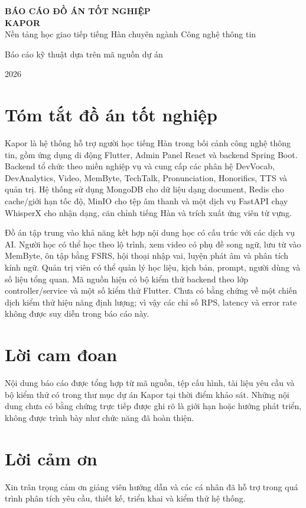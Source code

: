 \documentclass[12pt,a4paper]{report}
\begin{document}
\begin{titlepage}
\centering
\vspace*{1.2cm}
{\Large \textbf{BÁO CÁO ĐỒ ÁN TỐT NGHIỆP}}\\[1.2cm]
{\Huge \textbf{KAPOR}}\\[0.4cm]
{\Large Nền tảng học giao tiếp tiếng Hàn chuyên ngành Công nghệ thông tin}\par
\vfill
{\large Báo cáo kỹ thuật dựa trên mã nguồn dự án}\par
\vspace{1.5cm}
{\large 2026}
\end{titlepage}

\chapter*{Tóm tắt đồ án tốt nghiệp}
Kapor là hệ thống hỗ trợ người học tiếng Hàn trong bối cảnh công nghệ thông tin, gồm ứng dụng di động Flutter, Admin Panel React và backend Spring Boot. Backend tổ chức theo miền nghiệp vụ và cung cấp các phân hệ DevVocab, DevAnalytics, Video, MemByte, TechTalk, Pronunciation, Honorifics, TTS và quản trị. Hệ thống sử dụng MongoDB cho dữ liệu dạng document, Redis cho cache/giới hạn tốc độ, MinIO cho tệp âm thanh và một dịch vụ FastAPI chạy WhisperX cho nhận dạng, căn chỉnh tiếng Hàn và trích xuất ứng viên từ vựng.

Đồ án tập trung vào khả năng kết hợp nội dung học có cấu trúc với các dịch vụ AI. Người học có thể học theo lộ trình, xem video có phụ đề song ngữ, lưu từ vào MemByte, ôn tập bằng FSRS, hội thoại nhập vai, luyện phát âm và phân tích kính ngữ. Quản trị viên có thể quản lý học liệu, kịch bản, prompt, người dùng và số liệu tổng quan. Mã nguồn hiện có bộ kiểm thử backend theo lớp controller/service và một số kiểm thử Flutter. Chưa có bằng chứng về một chiến dịch kiểm thử hiệu năng định lượng; vì vậy các chỉ số RPS, latency và error rate không được suy diễn trong báo cáo này.

\chapter*{Lời cam đoan}
Nội dung báo cáo được tổng hợp từ mã nguồn, tệp cấu hình, tài liệu yêu cầu và bộ kiểm thử có trong thư mục dự án Kapor tại thời điểm khảo sát. Những nội dung chưa có bằng chứng trực tiếp được ghi rõ là giới hạn hoặc hướng phát triển, không được trình bày như chức năng đã hoàn thiện.

\chapter*{Lời cảm ơn}
Xin trân trọng cảm ơn giảng viên hướng dẫn và các cá nhân đã hỗ trợ trong quá trình phân tích yêu cầu, thiết kế, triển khai và kiểm thử hệ thống.
\end{document}
